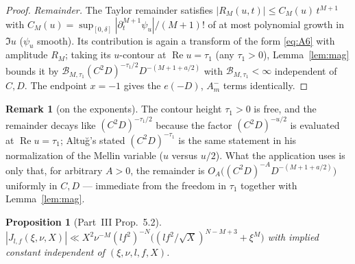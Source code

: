 \documentclass[11pt]{article}
\newtheorem{proposition}[theorem]{Proposition}
\theoremstyle{definition}
\newtheorem{remark}[theorem]{Remark}
\renewcommand{\Re}{\operatorname{Re}}
\begin{document}
\begin{proof}
\emph{Remainder.} The Taylor remainder satisfies $|R_M(u,t)|\le C_M(u)\,t^{M+1}$ with
$C_M(u)=\sup_{[0,\delta]}|\partial_t^{M+1}\psi_u|/(M+1)!$ of at most polynomial growth in $\Im u$
($\psi_u$ smooth). Its contribution is again a transform of the form \eqref{eq:A6} with amplitude
$R_M$; taking its $u$-contour at $\Re u=\tau_1$ (any $\tau_1>0$), Lemma~\ref{lem:mag} bounds it by
$\mathcal B_{M,\tau_1}(C^2D)^{-\tau_1/2}D^{-(M+1+a/2)}$ with $\mathcal B_{M,\tau_1}<\infty$
independent of $C,D$. The endpoint $x=-1$ gives the $e(-D)$, $A^-_m$ terms identically.
\end{proof}

\begin{remark}[on the exponents]
The contour height $\tau_1>0$ is free, and the remainder decays like $(C^2D)^{-\tau_1/2}$ because the
factor $(C^2D)^{-u/2}$ is evaluated at $\Re u=\tau_1$; Altu\u{g}'s stated $(C^2D)^{-\tau_1}$ is the same
statement in his normalization of the Mellin variable ($u$ versus $u/2$). What the application uses is
only that, for arbitrary $A>0$, the remainder is $O_A\big((C^2D)^{-A}D^{-(M+1+a/2)}\big)$ uniformly in
$C,D$ --- immediate from the freedom in $\tau_1$ together with Lemma~\ref{lem:mag}.
\end{remark}

\begin{proposition}[Part~III Prop.~5.2]\label{prop:52}
$|J_{l,f}(\xi,\nu,X)|\ll X^2\nu^{-M}(lf^2)^{-N}\big((lf^2/\sqrt X)^{N-M+3}+\xi^M\big)$ with implied
constant independent of $(\xi,\nu,l,f,X)$.
\end{proposition}
\end{document}
